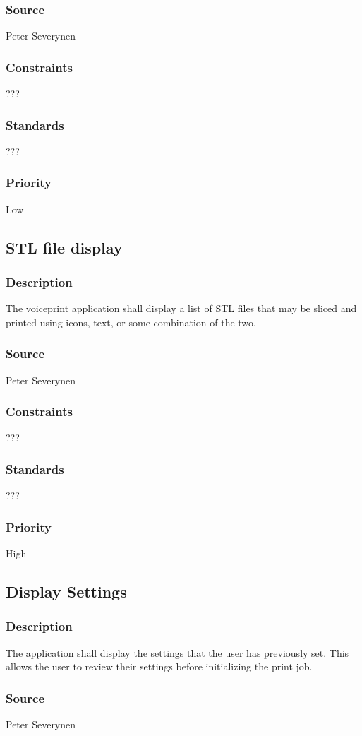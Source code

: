 \subsubsection{Source}
Peter Severynen
\subsubsection{Constraints}
???
\subsubsection{Standards}
???
\subsubsection{Priority}
Low
\subsection{STL file display}
\subsubsection{Description}
The voiceprint application shall display a list of STL files that may be sliced and printed using icons, text, or some combination of the two.
\subsubsection{Source}
Peter Severynen
\subsubsection{Constraints}
???
\subsubsection{Standards}
???
\subsubsection{Priority}
High
\subsection{Display Settings}
\subsubsection{Description}
The application shall display the settings that the user has previously set. This allows the user to review their settings before initializing the print job.
\subsubsection{Source}
Peter Severynen
